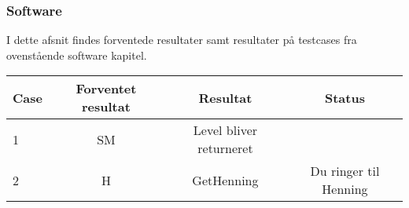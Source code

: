 \subsubsection{Software}
I dette afsnit findes forventede resultater samt resultater på testcases fra ovenstående software kapitel.\\
\begin{table}[htbp]
\centering
\begin{tabular}{| l  | c | c | c |}
\hline
Case &Forventet resultat &Resultat &Status\\\hline
1 &SM &Level bliver returneret & \\\hline
2 &H &GetHenning &Du ringer til Henning\\\hline
\end{tabular}
\end{table}